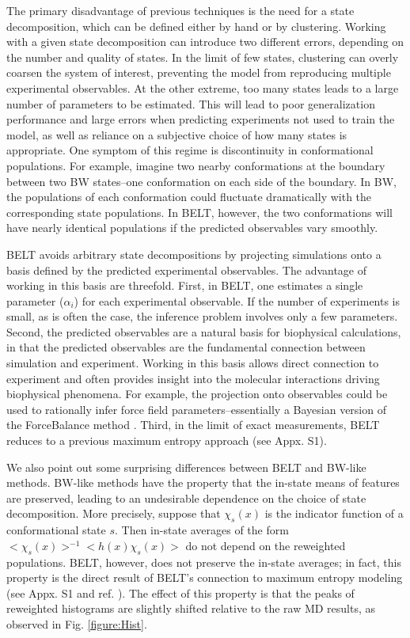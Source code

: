 \documentclass[11pt,titlepage]{article}
\begin{document}
The primary disadvantage of previous techniques is the need for a state decomposition, which can be defined either by hand or by clustering.  Working with a given state decomposition can introduce two different errors, depending on the number  and quality of states.  In the limit of few states, clustering can overly coarsen the system of interest, preventing the model from reproducing multiple experimental observables.  At the other extreme, too many states leads to a large number of parameters to be estimated. This will lead to poor generalization performance and large errors when predicting experiments not used to train the model, as well as reliance on a subjective choice of how many states is appropriate.  One symptom of this regime is discontinuity in conformational populations. For example, imagine two nearby conformations at the boundary between two BW states--one conformation on each side of the boundary.  In BW, the populations of each conformation could fluctuate dramatically with the 
corresponding 
state populations.  In BELT, however, the two conformations will have nearly identical populations if the predicted observables vary smoothly.

BELT avoids arbitrary state decompositions by projecting simulations onto a basis defined by the predicted experimental observables.  The advantage of working in this basis are threefold. First, in BELT, one estimates a single parameter ($\alpha_i$) for each experimental observable.  If the number of experiments is small, as is often the case, the inference problem involves only a few parameters.  Second, the predicted observables are a natural basis for biophysical calculations, in that the predicted observables are the fundamental connection between simulation and experiment.  Working in this basis allows direct connection to experiment and often provides insight into the molecular interactions driving biophysical phenomena.  For example, the projection onto observables could be used to rationally infer force field parameters--essentially a Bayesian version of the ForceBalance method  \citep{wang2012, wang2013systematic}.  Third, in the limit of exact measurements, BELT reduces to a previous  \citep{
chodera2012} maximum entropy approach (see Appx. S1).  

We also point out some surprising differences between BELT and BW-like methods.  BW-like methods have the property that the in-state means of features are preserved, leading to an undesirable dependence on the choice of state decomposition.  More precisely, suppose that $\chi_s(x)$ is the indicator function of a conformational state $s$.  Then in-state averages of the form $<\chi_s(x)>^{-1} <h(x) \chi_s(x)>$ do not depend on the reweighted populations.  BELT, however, does not preserve the in-state averages; in fact, this property is the direct result of BELT's connection to maximum entropy modeling (see Appx. S1 and ref.  \citep{chodera2012}).  The effect of this property is that the peaks of reweighted histograms are slightly shifted relative to the raw MD results, as observed in Fig. \ref{figure:Hist}.   
\end{document}
